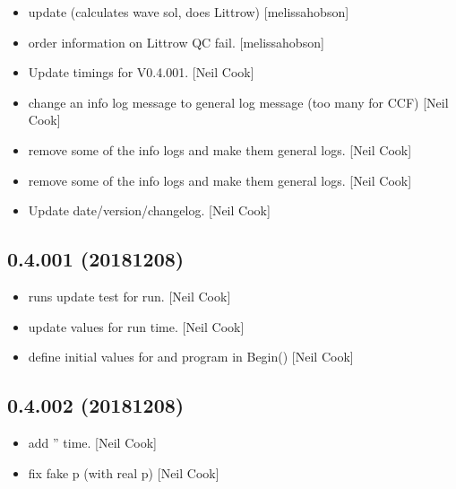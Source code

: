 \documentclass[a4paper,10pt,english]{report}
\begin{document}
\begin{itemize}
\item {} 
 update (calculates wave sol, does Littrow)
{[}melissa\sphinxhyphen{}hobson{]}

\item {} 
 order information on Littrow QC fail. {[}melissa\sphinxhyphen{}hobson{]}

\item {} 
Update timings for V0.4.001. {[}Neil Cook{]}

\item {} 
 \sphinxhyphen{} change an info log message to general log message (too
many for CCF) {[}Neil Cook{]}

\item {} 
 \sphinxhyphen{} remove some of the info logs and make them general
logs. {[}Neil Cook{]}

\item {} 
 \sphinxhyphen{} remove some of the info logs and make them general
logs. {[}Neil Cook{]}

\item {} 
Update date/version/changelog. {[}Neil Cook{]}

\end{itemize}


\subsection{0.4.001 (2018\sphinxhyphen{}12\sphinxhyphen{}08)}
\label{\detokenize{misc/changelog:id262}}\begin{itemize}
\item {} 
 runs \sphinxhyphen{} update test for run. {[}Neil Cook{]}

\item {} 
 \sphinxhyphen{} update values for run time. {[}Neil Cook{]}

\item {} 
 \sphinxhyphen{} define initial values for  and program in
Begin() {[}Neil Cook{]}

\end{itemize}


\subsection{0.4.002 (2018\sphinxhyphen{}12\sphinxhyphen{}08)}
\label{\detokenize{misc/changelog:id263}}\begin{itemize}
\item {} 
 \sphinxhyphen{} add ” time. {[}Neil Cook{]}

\item {} 
 \sphinxhyphen{} fix fake p (with real p) {[}Neil Cook{]}

\end{itemize}
\end{document}
